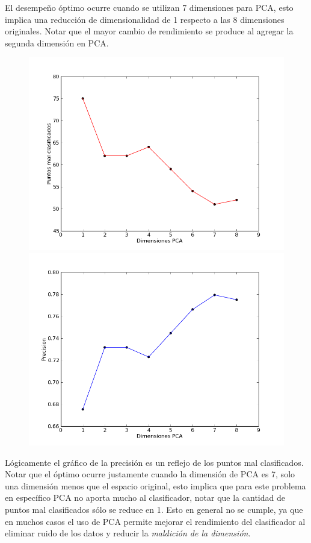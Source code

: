 \documentclass[letter, titlepage, 10pt]{article}
\begin{document}
El desempeño óptimo ocurre cuando se utilizan 7 dimensiones para PCA, esto implica una reducción de dimensionalidad de 1 respecto a las 8 dimensiones originales. Notar que el mayor cambio de rendimiento se produce al agregar la segunda dimensión en PCA. 

\begin{figure}[H]
  \centering
    \begin{minipage}{.5\textwidth}
        \centering
        \includegraphics[width=0.8\linewidth]{images/error_pca}
    \end{minipage}%
    \begin{minipage}{.5\textwidth}
        \centering
        \includegraphics[width=0.8\linewidth]{images/precision_pca}
    \end{minipage}
\end{figure}

Lógicamente el gráfico de la precisión es un reflejo de los puntos mal clasificados. Notar que el óptimo ocurre justamente cuando la dimensión de PCA es 7, solo una dimensión menos que el espacio original, esto implica que para este problema en específico PCA no aporta mucho al clasificador, notar que la cantidad de puntos mal clasificados sólo se reduce en 1. Esto en general no se cumple, ya que en muchos casos el uso de PCA permite mejorar el rendimiento del clasificador al eliminar ruido de los datos y reducir la \textit{maldición de la dimensión}.
\end{document}
